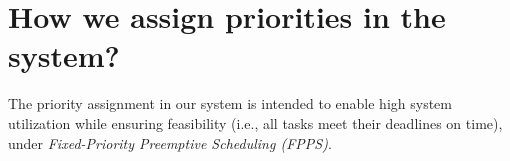\documentclass[sigconf, screen]{acmart}
\begin{document}
\section{How we assign priorities in the system?}
The priority assignment in our system is intended to enable high system
utilization while ensuring feasibility (i.e., all tasks meet their deadlines on
time), under \textit{Fixed-Priority Preemptive Scheduling (FPPS)}. \\

\begin{table}[H]
  \caption{Task Table}
  \label{tab:task-table}
\end{table}
\end{document}
